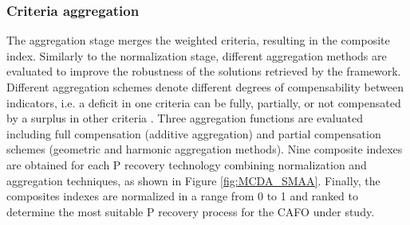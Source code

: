 \documentclass[authoryear]{elsarticle}
\begin{document}
\subsubsection{Criteria aggregation}
The aggregation stage merges the weighted criteria, resulting in the composite index. 
Similarly to the normalization stage, different aggregation methods are evaluated to improve the robustness of the solutions retrieved by the framework. Different aggregation schemes denote different degrees of compensability between indicators, i.e. a deficit in one criteria can be fully, partially, or not compensated by a surplus in other criteria \citep{MarcoCinelli2020}. Three aggregation functions are evaluated including full compensation (additive aggregation) and partial compensation schemes (geometric and harmonic aggregation methods). Nine composite indexes are obtained for each P recovery technology combining normalization and aggregation techniques, as shown in Figure \ref{fig:MCDA_SMAA}.
Finally, the composites indexes are normalized in a range from 0 to 1 and ranked to determine the most suitable P recovery process for the CAFO under study.
\end{document}
